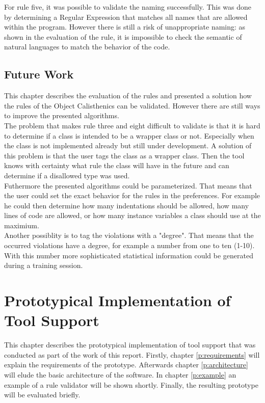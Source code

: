 For rule five, it was possible to validate the naming successfully. This was done by determining a Regular Expression that matches all names that are allowed within the program. However there is still a risk of unappropriate naming: as shown in the evaluation of the rule, it is impossible to check the semantic of natural languages to match the behavior of the code.

\section{Future Work}
\label{e:future}
This chapter describes the evaluation of the rules and presented a solution how the rules of the Object Calisthenics can be validated. However there are still ways to improve the presented algorithms. 
\\

The problem that makes rule three and eight difficult to validate is that it is hard to determine if a class is intended to be a wrapper class or not. Especially when the class is not implemented already but still under development. 
A solution of this problem is that the user tags the class as a wrapper class. Then the tool knows with certainty what rule the class will have in the future and can determine if a disallowed type was used. 
\\

Futhermore the presented algorithms could be parameterized. That means that the user could set the exact behavior for the rules in the preferences. For example he could then determine how many indentations should be allowed, how many lines of code are allowed, or how many instance variables a class should use at the maximium.
\\

Another possiblity is to tag the violations with a "degree". That means that the occurred violations have a degree, for example a number from one to ten (1-10). With this number more sophisticated statistical information could be generated during a training session. 
\\




















\chapter{Prototypical Implementation of Tool Support}
\label{Prototype}
This chapter describes the prototypical implementation of tool support that was conducted as part of the work of this report. Firstly, chapter \ref{p:requirements} will explain the requirements of the prototype. Afterwards chapter \ref{p:architecture} will elude the basic architecture of the software. In chapter \ref{p:example} an example of a rule validator will be shown shortly. Finally, the resulting prototype will be evaluated briefly. 

